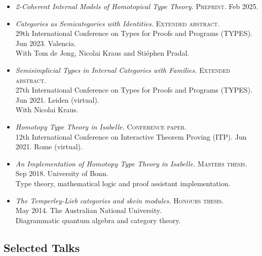 \documentclass[12pt,a4paper]{article}
\begin{document}
\begin{itemize}
\item
  \emph{2-Coherent Internal Models of Homotopical Type Theory.}
  \textsc{Preprint.}
  Feb 2025.\\
\item
  \emph{Categories as Semicategories with Identities.}
  \textsc{Extended abstract.}\\
  29th International Conference on Types for Proofs and Programs (TYPES).
  Jun 2023.
  Valencia.\\
  With Tom de Jong, Nicolai Kraus and Stiéphen Pradal.\\
\item
  \emph{Semisimplicial Types in Internal Categories with Families.}
  \textsc{Extended abstract.}\\
  27th International Conference on Types for Proofs and Programs (TYPES).
  Jun 2021.
  Leiden (virtual).\\
  With Nicolai Kraus.\\
\item
  \emph{Homotopy Type Theory in Isabelle.}
  \textsc{Conference paper.}\\
  12th International Conference on Interactive Theorem Proving (ITP).
  Jun 2021.
  Rome (virtual).\\
\item
  \emph{An Implementation of Homotopy Type Theory in Isabelle.}
  \textsc{Masters thesis.}\\
  Sep 2018.
  University of Bonn.\\
  Type theory, mathematical logic and proof assistant implementation.\\
\item
  \emph{The Temperley-Lieb categories and skein modules.}
  \textsc{Honours thesis.}\\
  May 2014.
  The Australian National University.\\
  Diagrammatic quantum algebra and category theory.\\
\end{itemize}

\subsection{Selected Talks}
\end{document}
